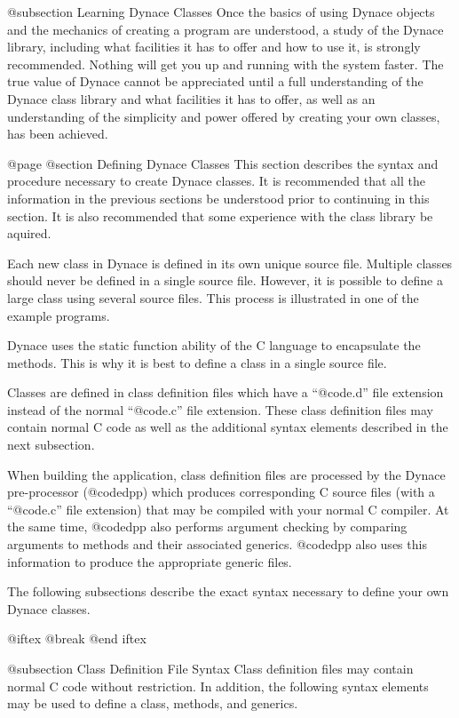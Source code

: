 @subsection Learning Dynace Classes
Once the basics of using Dynace objects and the mechanics of creating a
program are understood, a study of the Dynace library, including what
facilities it has to offer and how to use it, is strongly recommended.
Nothing will get you up and running with the system faster.  The true
value of Dynace cannot be appreciated until a full understanding of the Dynace
class library and what facilities it has to offer, as well as an
understanding of the simplicity and power offered by creating your own
classes, has been achieved.

@page
@section Defining Dynace Classes
This section describes the syntax and procedure necessary to create
Dynace classes.  It is recommended that all the information in the
previous sections be understood prior to continuing in this section.  It
is also recommended that some experience with the class library be
aquired.

Each new class in Dynace is defined in its own unique source file.
Multiple classes should never be defined in a single source file.
However, it is possible to define a large class using several source files.
This process is illustrated in one of the example programs.

Dynace uses the static function ability of the C language to encapsulate
the methods.  This is why it is best to define a class in a single
source file.

Classes are defined in class definition files which have a
``@code{.d}'' file extension instead of the normal ``@code{.c}''
file extension.  These class definition files may contain normal
C code as well as the additional syntax elements described in the
next subsection.

When building the application, class definition files are processed
by the Dynace pre-processor (@code{dpp}) which produces corresponding
C source files (with a ``@code{.c}'' file extension) that may be
compiled with your normal C compiler.  At the same time, @code{dpp}
also performs argument checking by comparing arguments to methods
and their associated generics.  @code{dpp} also uses this information
to produce the appropriate generic files.


The following subsections describe the exact syntax
necessary to define your own Dynace classes.

@iftex
@break
@end iftex

@subsection Class Definition File Syntax
Class definition files may contain normal C code without restriction.
In addition, the following syntax elements may be used to define a class,
methods, and generics.


